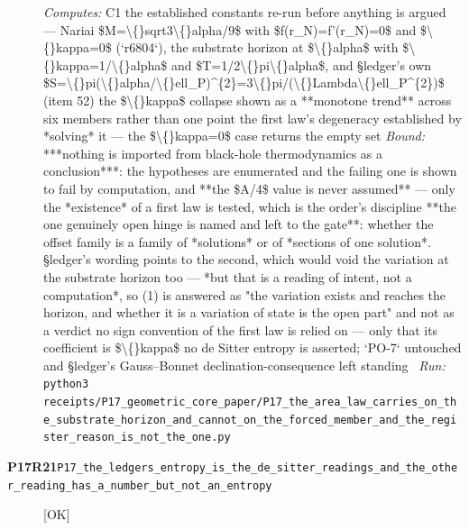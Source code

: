 \begin{description}
\emph{Computes:} C1 the established constants re-run before anything is argued --- Nariai \$M=\textbackslash\{\}sqrt3\textbackslash\{\}alpha/9\$ with \$f(r\_N)=f'(r\_N)=0\$ and \$\textbackslash\{\}kappa=0\$ (`r6804`), the substrate horizon at \$\textbackslash\{\}alpha\$ with \$\textbackslash\{\}kappa=1/\textbackslash\{\}alpha\$ and \$T=1/2\textbackslash\{\}pi\textbackslash\{\}alpha\$, and \S{}ledger's own \$S=\textbackslash\{\}pi(\textbackslash\{\}alpha/\textbackslash\{\}ell\_P)\textasciicircum{}\{2\}=3\textbackslash\{\}pi/(\textbackslash\{\}Lambda\textbackslash\{\}ell\_P\textasciicircum{}\{2\})\$ (item 52)  the \$\textbackslash\{\}kappa\$ collapse shown as a **monotone trend** across six members rather than one point  the first law's degeneracy established by *solving* it --- the \$\textbackslash\{\}kappa=0\$ case returns the empty set
 \emph{Bound:}  ***nothing is imported from black-hole thermodynamics as a conclusion***: the hypotheses are enumerated and the failing one is shown to fail by computation, and **the \$A/4\$ value is never assumed** --- only the *existence* of a first law is tested, which is the order's discipline  **the one genuinely open hinge is named and left to the gate**: whether the offset family is a family of *solutions* or of *sections of one solution*. \S{}ledger's wording points to the second, which would void the variation at the substrate horizon too --- *but that is a reading of intent, not a computation*, so (1) is answered as "the variation exists and reaches the horizon, and whether it is a variation of state is the open part" and not as a verdict  no sign convention of the first law is relied on --- only that its coefficient is \$\textbackslash\{\}kappa\$  no de Sitter entropy is asserted; `PO-7` untouched and \S{}ledger's Gauss--Bonnet declination-consequence left standing
\ \emph{Run:} \texttt{python3 receipts/P17\_geometric\_core\_paper/P17\_the\_area\_law\_carries\_on\_the\_substrate\_horizon\_and\_cannot\_on\_the\_forced\_member\_and\_the\_register\_reason\_is\_not\_the\_one.py}
\item[\rcptlabel{P17_the_ledgers_entropy_is_the_de_sitter_readings_and_the_other_reading_has_a_number_but_not_an_entropy}{P17R21}\textbf{P17R21}\quad\texttt{P17\_the\_ledgers\_entropy\_is\_the\_de\_sitter\_readings\_and\_the\_other\_reading\_has\_a\_number\_but\_not\_an\_entropy}]\hfill\textsf{[OK]}\\

\end{description}
